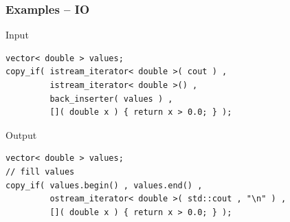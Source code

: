 \documentclass{beamer}
\newcommand{\heading}[1]{\frametitle{#1}}
\begin{document}
\begin{frame}[fragile]
  \heading{Examples -- IO}

Input
\begin{lstlisting}[basicstyle=\scriptsize\ttfamily]
vector< double > values;  
copy_if( istream_iterator< double >( cout ) ,
         istream_iterator< double >() ,
         back_inserter( values ) ,
         []( double x ) { return x > 0.0; } );
\end{lstlisting}
\vspace{2ex}
Output
\begin{lstlisting}[basicstyle=\scriptsize\ttfamily]
vector< double > values;  
// fill values
copy_if( values.begin() , values.end() ,
         ostream_iterator< double >( std::cout , "\n" ) ,
         []( double x ) { return x > 0.0; } );
\end{lstlisting}

\end{frame}
\end{document}

